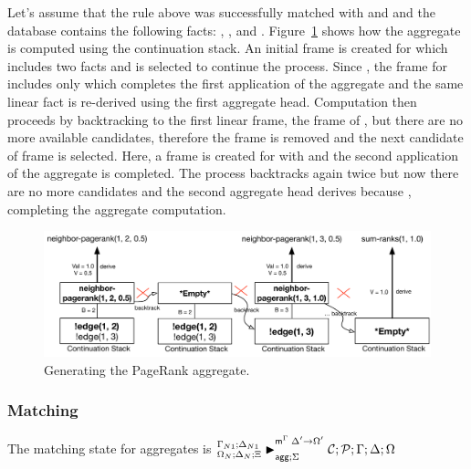Let's assume that the rule above was successfully matched with  and
 and the database contains the following facts: , ,  and
. Figure~\ref{fig:logic:backtrack} shows how
the aggregate is computed using the continuation stack. An initial frame is
created for  which includes two  facts and
 is selected to continue the process. Since ,
the frame for  includes only
 which completes the first application of the
aggregate and the same linear fact is re-derived using the first aggregate head.
Computation then proceeds by backtracking to the first linear frame, the frame
of , but there are no more available
candidates, therefore the frame is removed and the next candidate  of frame  is selected. Here, a frame is
created for  with  and the second
application of the aggregate is completed. The process backtracks again twice
but now there are no more candidates and the second aggregate head derives
 because , completing the aggregate
computation.

\begin{figure}[ht]
   \begin{center}
      \includegraphics[width=0.85\linewidth]{figures/logical_foundations/backtrack.pdf}
   \end{center}
   \caption{Generating the PageRank aggregate.}
   \label{fig:logic:backtrack}
\end{figure}

\subsubsection{Matching}

The matching state for aggregates is 
$\matstatea{\Delta_N}{\lstack{C};
   \lstack{P}}{\Gamma}{\Delta}{\Omega}{\Delta' \rightarrow \Omega'}{\Sigma}$

